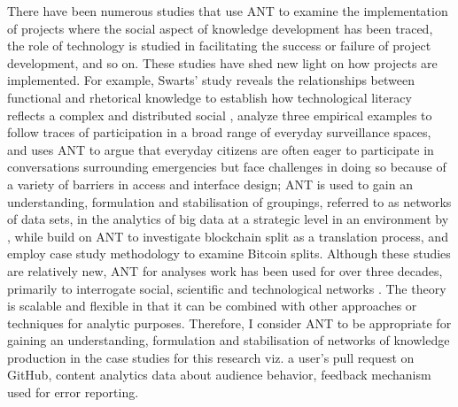 There have been numerous studies that use ANT to examine the implementation of projects where the social aspect of knowledge development has been traced, the role of technology is studied in facilitating the success or failure of project development, and so on. These studies have shed new light on how projects are implemented. For example, Swarts' study reveals the relationships between functional and rhetorical knowledge to establish how technological literacy reflects a complex and distributed social \cite{swarts2011technological}, \textcite{albrechtslund2013spaces} analyze three empirical examples to follow traces of participation in a broad range of everyday surveillance spaces, and \cite{potts2019boycotting} uses ANT to argue that everyday citizens are often eager to participate in conversations surrounding emergencies but face challenges in doing so because of a variety of barriers in access and interface design; ANT is used to gain an understanding, formulation and stabilisation of groupings, referred to as networks of data sets, in the analytics of big data at a strategic level in an environment by \textcite{Iyamu_2018}, while \textcite{islam2019blockchains} build on ANT to investigate blockchain split as a translation process, and employ case study methodology to examine Bitcoin splits. Although these studies are relatively new, ANT for analyses work has been used for over three decades, primarily to interrogate social, scientific and technological networks \cite{horowitz2012translation}. The theory is scalable and flexible in that it can be combined with other approaches or techniques for analytic purposes. Therefore, I consider ANT to be appropriate for gaining an understanding, formulation and stabilisation of networks of knowledge production in the case studies for this research viz. a user's pull request on GitHub, content analytics data about audience behavior, feedback mechanism used for error reporting.

